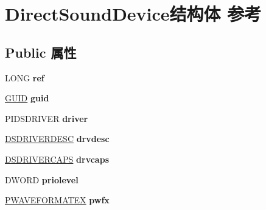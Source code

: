 \hypertarget{struct_direct_sound_device}{}\section{Direct\+Sound\+Device结构体 参考}
\label{struct_direct_sound_device}
\subsection*{Public 属性}
\begin{DoxyCompactItemize}
\item 
\mbox{\label{struct_direct_sound_device_aa7d83bdd2f4499438154e4db29a76b33}} 
L\+O\+NG {\bfseries ref}
\item 
\mbox{\label{struct_direct_sound_device_a65d2456f8fe2f61a7ea5218c3343536e}} 
\hyperlink{interface_g_u_i_d}{G\+U\+ID} {\bfseries guid}
\item 
\mbox{\label{struct_direct_sound_device_a39869cc0847080914bc24d961ee0e29f}} 
P\+I\+D\+S\+D\+R\+I\+V\+ER {\bfseries driver}
\item 
\mbox{\label{struct_direct_sound_device_adf92172dc13f00174ac7e5566a931e31}} 
\hyperlink{struct___d_s_d_r_i_v_e_r_d_e_s_c}{D\+S\+D\+R\+I\+V\+E\+R\+D\+E\+SC} {\bfseries drvdesc}
\item 
\mbox{\label{struct_direct_sound_device_a9ae8efe61940967f6373dc1ca9240ed8}} 
\hyperlink{struct___d_s_d_r_i_v_e_r_c_a_p_s}{D\+S\+D\+R\+I\+V\+E\+R\+C\+A\+PS} {\bfseries drvcaps}
\item 
\mbox{\label{struct_direct_sound_device_a06863236bf4affd34cd9997a0ec51e8a}} 
D\+W\+O\+RD {\bfseries priolevel}
\item 
\mbox{\label{struct_direct_sound_device_a8195669089371e71a73c445aef4e524f}} 
\hyperlink{struct___w_a_v_e_f_o_r_m_a_t_e_x}{P\+W\+A\+V\+E\+F\+O\+R\+M\+A\+T\+EX} {\bfseries pwfx}
\item 
\mbox{\label{struct_direct_sound_device_a827bbe93690e1784cf144abc2f4a2ae4}} 

\end{DoxyCompactItemize}
